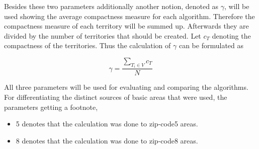 Besides these two parameters additionally another notion, denoted as $\gamma$, will be used showing the average compactness measure for each algorithm. Therefore the compactness measure of each territory will be summed up. Afterwards they are divided by the number of territories that should be created. Let $c_{T}$ denoting the compactness of the territories. Thus the calculation of $\gamma$ can be formulated as

\[ \mathit{\gamma  = \frac{\sum\nolimits  _{T_{i} \in V} c_{T}}{N}}\]

All three parameters will be used for evaluating and comparing the algorithms. For 
differentiating the distinct sources of basic areas that were used, the parameters getting a footnote,
 \begin{itemize}
 	\item 5 denotes that the calculation was done to zip-code5 areas.
 	\item 8  denotes that the calculation was done to zip-code8 areas.
 \end{itemize}
 
